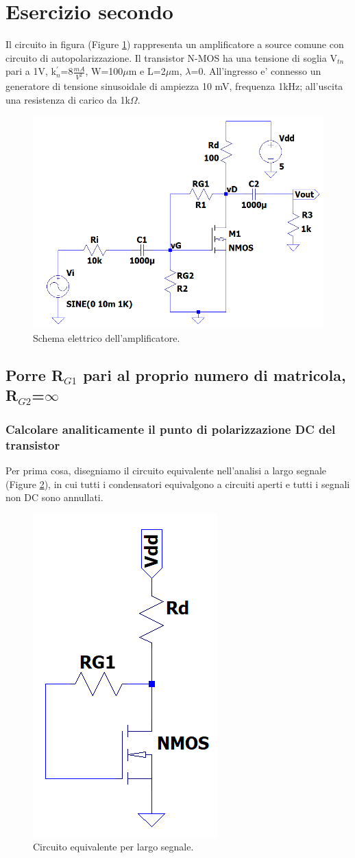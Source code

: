 \documentclass[a4paper,10pt]{article}
\begin{document}
\pagebreak

\section{Esercizio secondo}
Il circuito in figura (Figure \ref{fig:ckt2}) rappresenta un amplificatore a source comune con circuito di autopolarizzazione. Il transistor N-MOS ha una tensione di soglia V$_{tn}$ pari a 1V, k$^{'}_{n}$=8$\frac{mA}{V^2}$, W=100$\mu$m e L=2$\mu$m, $\lambda$=0. All'ingresso e' connesso un generatore di tensione sinusoidale di ampiezza 10
mV, frequenza 1kHz; all'uscita una resistenza di carico da 1k$\Omega$.

\begin{figure}[h!]
  	\centering
 	\includegraphics[width=0.6\linewidth]{ckt2.png}
  	\caption{Schema elettrico dell'amplificatore.}
  	\label{fig:ckt2}
\end{figure}

\subsection{Porre R$_{G1}$ pari al proprio numero di matricola, R$_{G2}$=$\infty$}

\subsubsection{Calcolare analiticamente il punto di polarizzazione DC del transistor}
Per prima cosa, disegniamo il circuito equivalente nell'analisi a largo segnale (Figure \ref{fig:pol1}), in cui tutti i condensatori equivalgono a circuiti aperti e tutti i segnali non DC sono annullati.

\begin{figure}[h!]
 	\includegraphics[width=0.16\linewidth]{pol1.png}
 	\centering
 	\caption{Circuito equivalente per largo segnale.}
  	\label{fig:pol1}
\end{figure}
\end{document}
